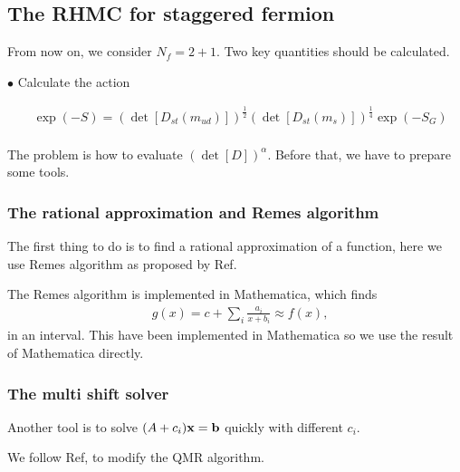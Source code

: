 \subsection{\label{sec:rhmc}The RHMC for staggered fermion}

From now on, we consider $N_f=2+1$. Two key quantities should be calculated.

$\bullet$ Calculate the action

\begin{equation}
\begin{split}
&\exp(-S)=\left(\det [D_{st}(m_{ud})]\right)^{\frac{1}{2}}\left(\det [D_{st}(m_s)]\right)^{\frac{1}{4}} \exp (-S_G)\\
\end{split}
\end{equation}

The problem is how to evaluate $\left(\det [D]\right)^{\alpha}$. Before that, we have to prepare some tools.

\subsubsection{\label{sec:rationalapproximation}The rational approximation and Remes algorithm}

The first thing to do is to find a rational approximation of a function, here we use Remes algorithm as proposed by Ref.

The Remes algorithm is implemented in Mathematica, which finds
\begin{equation}
\begin{split}
&g(x)=c+\sum _i \frac{a_i}{x+b_i}\approx f(x),
\end{split}
\end{equation}
in an interval. This have been implemented in Mathematica so we use the result of Mathematica directly.

\subsubsection{\label{sec:multishiftsolver}The multi shift solver}

Another tool is to solve $(A + c_i) {\bf x} = {\bf b}$ quickly with different $c_i$.

We follow Ref, to modify the QMR algorithm.

